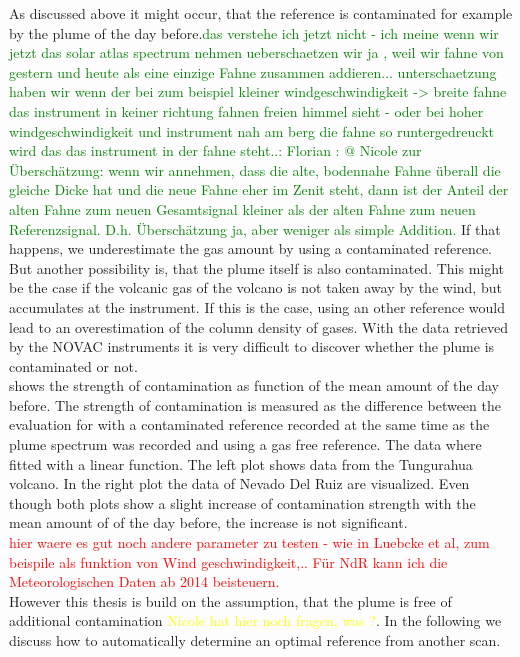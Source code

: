 As discussed above it might occur, that the reference is contaminated for example by the plume of the day before.\textcolor{green}{das verstehe ich jetzt nicht - ich meine wenn wir jetzt das solar atlas spectrum nehmen ueberschaetzen wir ja , weil wir fahne von gestern und heute als eine einzige Fahne zusammen addieren...
	unterschaetzung haben wir wenn der bei zum beispiel kleiner windgeschwindigkeit -> breite fahne das instrument in keiner richtung fahnen freien himmel sieht - oder bei hoher windgeschwindigkeit und instrument nah am berg die fahne so runtergedreuckt wird das das instrument in der fahne steht..: Florian : @ Nicole zur Überschätzung: wenn wir annehmen, dass die alte, bodennahe Fahne überall die gleiche Dicke hat und die neue Fahne eher im Zenit steht, dann ist der Anteil der alten Fahne zum neuen Gesamtsignal kleiner als der alten Fahne zum neuen Referenzsignal. D.h. Überschätzung ja, aber weniger als simple Addition.} If that happens, we underestimate the gas amount by using a contaminated reference. But another possibility is, that the plume itself is also contaminated. This might be the case if the volcanic gas of the volcano is not taken away by the wind, but accumulates at the instrument. If this is the case, using an other reference would lead to an overestimation of the column density of gases. With the data retrieved by the NOVAC instruments it is very difficult to discover whether the plume is contaminated or not. \\
 shows the strength of contamination as function of the mean  amount of the day before. The strength of contamination is  measured as the difference between the evaluation for  with a contaminated reference recorded at the same time as the plume spectrum was recorded and using a gas free reference. The data where fitted with a linear function. The left plot shows data from the Tungurahua volcano. In the right plot the data of Nevado Del Ruiz are visualized. Even though both plots show a slight increase of contamination strength with the mean amount of  of the day before, the increase is not significant.\\
\textcolor{red}{hier waere es gut noch andere parameter zu testen - wie in Luebcke et al, zum beispile als funktion von Wind geschwindigkeit,..   Für NdR kann ich die Meteorologischen Daten ab 2014 beisteuern.}
\\
However this thesis is build on the assumption, that the plume is free of additional contamination \textcolor{yellow}{Nicole hat hier noch fragen, was ?}. In the following we discuss how to automatically determine an optimal reference from another scan.
